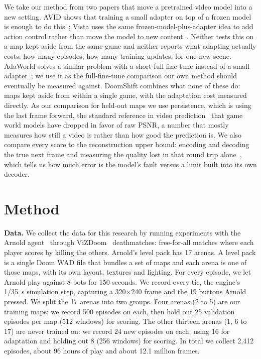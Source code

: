 \documentclass{article}
\begin{document}
We take our method from two papers that move a pretrained video model into a new setting. AVID shows that training a small adapter on top of a frozen model is enough to do this~\citep{rigter2024avid}; Vista uses the same frozen-model-plus-adapter idea to add action control rather than move the model to new content~\citep{gao2024vista}. Neither tests this on a map kept aside from the same game and neither reports what adapting actually costs: how many episodes, how many training updates, for one new scene. AdaWorld solves a similar problem with a short full fine-tune instead of a small adapter~\citep{gao2025adaworld}; we use it as the full-fine-tune comparison our own method should eventually be measured against. DoomShift combines what none of these do: maps kept aside from within a single game, with the adaptation cost measured directly. As our comparison for held-out maps we use persistence, which is using the last frame forward, the standard reference in video prediction~\citep{mathieu2016deep,lotter2017prednet,villegas2019fidelity} that game world models have dropped in favor of raw PSNR, a number that mostly measures how still a video is rather than how good the prediction is. We also compare every score to the reconstruction upper bound: encoding and decoding the true next frame and measuring the quality lost in that round trip alone~\citep{zheng2023occworld,karypidis2024dinoforesight}, which tells us how much error is the model's fault versus a limit built into its own decoder.

\section{Method}
\label{sec:bench}

\textbf{Data.} We collect the data for this research by running experiments with the Arnold agent~\citep{lample2017arnold} through ViZDoom~\citep{kempka2016vizdoom} deathmatches: free-for-all matches where each player scores by killing the others. Arnold's level pack has 17 arenas. A level pack is a single Doom WAD file that bundles a set of maps and each arena is one of those maps, with its own layout, textures and lighting. For every episode, we let Arnold play against 8 bots for 150 seconds. We record every tic, the engine's 1/35~s simulation step, capturing a 320$\times$240 frame and the 19 buttons Arnold pressed. We split the 17 arenas into two groups. Four arenas (2 to 5) are our training maps: we record 500 episodes on each, then hold out 25 validation episodes per map (512 windows) for scoring. The other thirteen arenas (1, 6 to 17) are never trained on: we record 24 new episodes on each, using 16 for adaptation and holding out 8 (256 windows) for scoring. In total we collect 2,412 episodes, about 96 hours of play and about 12.1 million frames.
\end{document}
